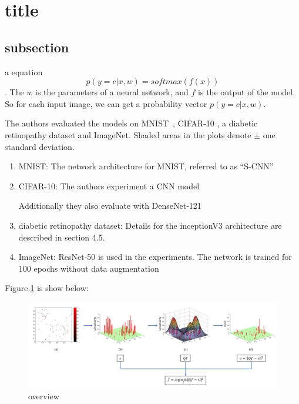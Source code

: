 \section{title}

\subsection{subsection}

a equation
$$
p(y=c|x, w) = softmax(f(x))
$$
. The $w$ is the parameters of a neural network, and $f$ is the output of the model. So for each input image, we can get a probability vector $p(y=c|x, w)$.

The authors evaluated the models on MNIST~\cite{mnist}, CIFAR-10 \cite{cifar10}, a diabetic retinopathy dataset \cite{retinopathy} and ImageNet\cite{resnet}. Shaded areas in the plots denote $\pm$ one standard deviation.


\begin{enumerate}
    \item MNIST: The network architecture for MNIST, referred to as “S-CNN”
    \item CIFAR-10: The authors experiment a CNN model 
    
    Additionally they also evaluate with DenseNet-121 
    \item diabetic retinopathy dataset: Details for the inceptionV3 architecture are described in section 4.5.
    \item ImageNet: ResNet-50\cite{resnet} is used in the experiments. The network is trained for 100 epochs without data augmentation
\end{enumerate}

Figure.\ref{figure1} is show below:

\begin{figure}[ht!]
    \centering
    \includegraphics[width=15.4cm]{sparse_overview.png}
    \caption{overview}
    \label{figure1}
\end{figure}